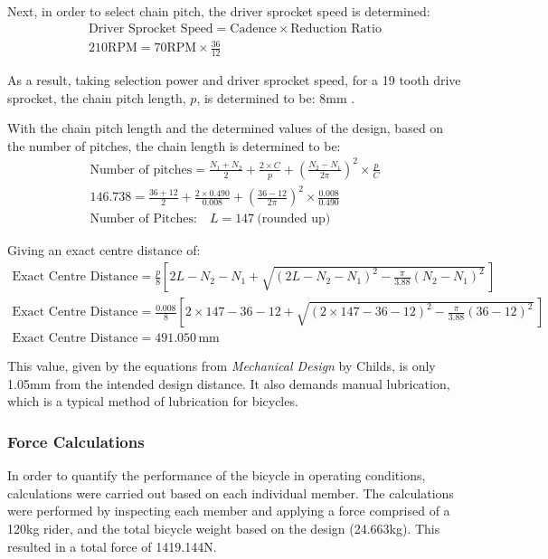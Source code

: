 \documentclass[a4paper,11pt]{article}
\begin{document}
Next, in order to select chain pitch, the driver sprocket speed is determined:
\begin{gather*}
	\text{Driver Sprocket Speed}=\text{Cadence}\times\text{Reduction Ratio}\\
	210\text{RPM}=70\text{RPM}\times\frac{36}{12}
\end{gather*}

As a result, taking selection power and driver sprocket speed, for a 19 tooth drive sprocket, the chain pitch length, $p$, is determined to be: 8mm \cite{childs04}.

With the chain pitch length and the determined values of the design, based on the number of pitches, the chain length is determined to be:
\begin{gather*}
	\text{Number of pitches}=\frac{N_{1}+N_{2}}{2}+\frac{2\times C}{p}+\left(\frac{N_{2}-N_{1}}{2{\pi}}\right)^{2}\times\frac{p}{C}\\
	146.738=\frac{36+12}{2}+\frac{2\times 0.490}{0.008}+\left(\frac{36-12}{2{\pi}}\right)^{2}\times\frac{0.008}{0.490}\\
	\text{Number of Pitches:}\quad L=147\ \text{(rounded up)}
\end{gather*}

Giving an exact centre distance of:
\begin{gather*}
	\text{Exact Centre Distance}=\frac{p}{8}\left[2L-N_{2}-N_{1}+\sqrt{\left(2L-N_{2}-N_{1}\right)^{2}-\frac{{\pi}}{3.88}\left(N_{2}-N_{1}\right)^{2}}\,\right]\\
	\text{Exact Centre Distance}=\frac{0.008}{8}\left[2\times 147-36-12+\sqrt{\left(2\times 147-36-12\right)^{2}-\frac{{\pi}}{3.88}\left(36-12\right)^{2}}\,\right]\\
	\text{Exact Centre Distance}=491.050\,\text{mm}
\end{gather*}

This value, given by the equations from \textit{Mechanical Design} by Childs, is only 1.05mm from the intended design distance. It also demands manual lubrication, which is a typical method of lubrication for bicycles.

\subsubsection{Force Calculations}

In order to quantify the performance of the bicycle in operating conditions, calculations were carried out based on each individual member. The calculations were performed by inspecting each member and applying a force comprised of a 120kg rider, and the total bicycle weight based on the design (24.663kg). This resulted in a total force of 1419.144N. 
\end{document}
